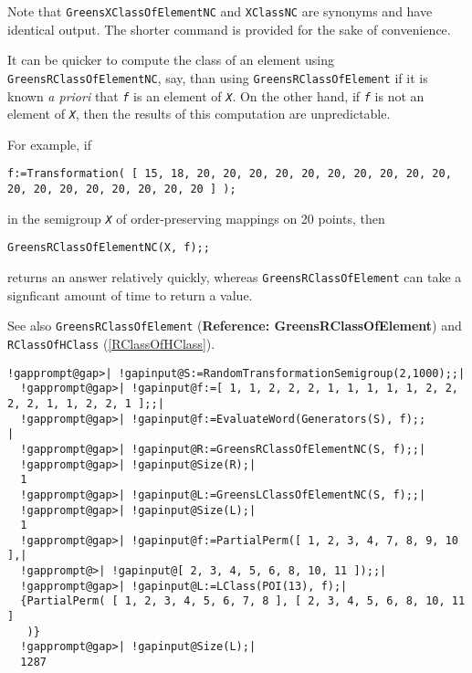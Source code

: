 \documentclass[a4paper,11pt]{report}
\begin{document}
{{{ Note that \texttt{GreensXClassOfElementNC} and \texttt{XClassNC} are synonyms and have identical output. The shorter command is provided for
the sake of convenience. 

 It can be quicker to compute the class of an element using \texttt{GreensRClassOfElementNC}, say, than using \texttt{GreensRClassOfElement} if it is known \emph{a priori} that \mbox{\texttt{\mdseries\slshape f}} is an element of \mbox{\texttt{\mdseries\slshape X}}. On the other hand, if \mbox{\texttt{\mdseries\slshape f}} is not an element of \mbox{\texttt{\mdseries\slshape X}}, then the results of this computation are unpredictable.

 For example, if 
\begin{Verbatim}[commandchars=!@|,fontsize=\small,frame=single,label=Example]
  f:=Transformation( [ 15, 18, 20, 20, 20, 20, 20, 20, 20, 20, 20, 20, 20, 20, 20, 20, 20, 20, 20, 20 ] );
\end{Verbatim}
 in the semigroup \mbox{\texttt{\mdseries\slshape X}} of order-preserving mappings on 20 points, then 
\begin{Verbatim}[commandchars=!@|,fontsize=\small,frame=single,label=Example]
  GreensRClassOfElementNC(X, f);;
\end{Verbatim}
 returns an answer relatively quickly, whereas \texttt{GreensRClassOfElement} can take a signficant amount of time to return a value.

 See also \texttt{GreensRClassOfElement} (\textbf{Reference: GreensRClassOfElement}) and \texttt{RClassOfHClass} (\ref{RClassOfHClass}). 
\begin{Verbatim}[commandchars=!@|,fontsize=\small,frame=single,label=Example]
  !gapprompt@gap>| !gapinput@S:=RandomTransformationSemigroup(2,1000);;|
  !gapprompt@gap>| !gapinput@f:=[ 1, 1, 2, 2, 2, 1, 1, 1, 1, 1, 2, 2, 2, 2, 1, 1, 2, 2, 1 ];;|
  !gapprompt@gap>| !gapinput@f:=EvaluateWord(Generators(S), f);;                            |
  !gapprompt@gap>| !gapinput@R:=GreensRClassOfElementNC(S, f);;|
  !gapprompt@gap>| !gapinput@Size(R);|
  1
  !gapprompt@gap>| !gapinput@L:=GreensLClassOfElementNC(S, f);;|
  !gapprompt@gap>| !gapinput@Size(L);|
  1
  !gapprompt@gap>| !gapinput@f:=PartialPerm([ 1, 2, 3, 4, 7, 8, 9, 10 ],|
  !gapprompt@>| !gapinput@[ 2, 3, 4, 5, 6, 8, 10, 11 ]);;|
  !gapprompt@gap>| !gapinput@L:=LClass(POI(13), f);|
  {PartialPerm( [ 1, 2, 3, 4, 5, 6, 7, 8 ], [ 2, 3, 4, 5, 6, 8, 10, 11 ]
   )}
  !gapprompt@gap>| !gapinput@Size(L);|
  1287
\end{Verbatim}
 }

}}
\end{document}
